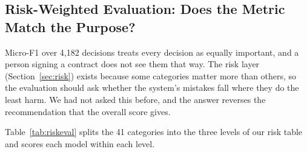 \subsection{Risk-Weighted Evaluation: Does the Metric Match the Purpose?}
\label{sec:riskeval}

Micro-F1 over 4{,}182 decisions treats every decision as equally important, and a person signing a contract does not see them that way. The risk layer (Section~\ref{sec:risk}) exists because some categories matter more than others, so the evaluation should ask whether the system's mistakes fall where they do the least harm. We had not asked this before, and the answer reverses the recommendation that the overall score gives.

Table~\ref{tab:riskeval} splits the 41 categories into the three levels of our risk table and scores each model within each level.

